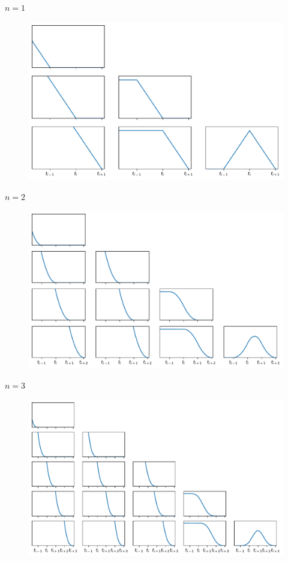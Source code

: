 \documentclass[12pt]{article}
\begin{document}
        \(n=1\)
        \begin{figure}[H]
            \centering
            \includegraphics[scale=0.8]{pics/G_1}
        \end{figure}
        \(n=2\)
        \begin{figure}[H]
            \centering
            \includegraphics[scale=0.8]{pics/G_2}
        \end{figure}
        \(n=3\)
        \begin{figure}[H]
            \centering
            \includegraphics[scale=0.8]{pics/G_3}
        \end{figure}
\end{document}
